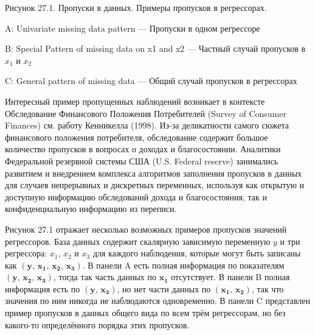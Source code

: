 \vspace{3cm}
Рисунок 27.1. Пропуски в данных. Примеры пропусков в регрессорах.

A: Univariate missing data pattern --- Пропуски в одном регрессоре

B: Special Pattern of missing data on x1 and x2 --- Частный случай пропусков в $x_1$ и $x_2$

C: General pattern of missing data --- Общий случай пропусков в регрессорах



Интересный пример пропущенных наблюдений возникает в контексте Обследование Финансового Положения Потребителей (Survey of Consumer Finances) см. работу Кенникелла (1998). Из-за деликатности самого сюжета финансового положения потребителя, обследование содержит большое количество пропусков в вопросах о доходах и благосостоянии. Аналитики Федеральной резервной системы США (U.S. Federal reserve) занимались развитием и внедрением комплекса алгоритмов заполнения пропусков в данных для случаев непрерывных и дискретных переменных, используя как открытую и доступную информацию обследований дохода и благосостояния, так и конфиденциальную информацию из переписи.

Рисунок 27.1 отражает несколько возможных примеров пропусков значений регрессоров. База данных содержит скалярную зависимую переменную $y$ и три регрессора: $x_1$, $x_2$ и $x_3$ для каждого наблюдения, которые могут быть записаны как $(\mathbf{y, \, x_1, \, x_2, \, x_3})$. В панели A есть полная информация по показателям $(\mathbf{y, \, x_2, \, x_3})$, тогда так часть данных по $\mathbf{x_1}$ отсутствует. В панели B полная информация есть по $(\mathbf{y, \, x_3})$, но нет части данных по $(\mathbf{x_1, \, x_2})$, так что значения по ним никогда не наблюдаются одновременно. В панели C представлен пример пропусков в данных общего вида по всем трём  регрессорам, но без какого-то определённого порядка этих пропусков.  

